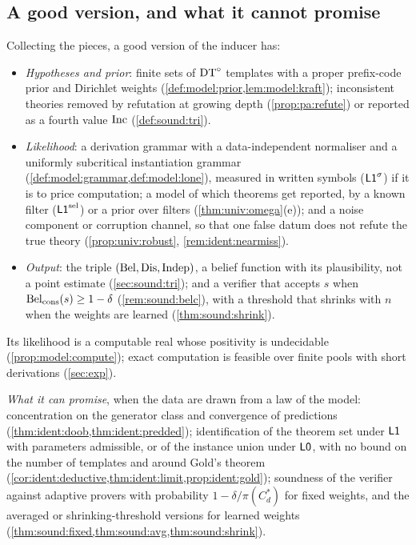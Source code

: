 \subsection{A good version, and what it cannot promise}\label{sec:disc:good}

Collecting the pieces, a good version of the inducer has:
\begin{itemize}[leftmargin=*]
\item \emph{Hypotheses and prior}: finite sets of $\mathrm{DT}^{\circ}$ templates with a proper prefix-code prior and Dirichlet weights (\cref{def:model:prior,lem:model:kraft}); inconsistent theories removed by refutation at growing depth (\cref{prop:pa:refute}) or reported as a fourth value $\mathrm{Inc}$ (\cref{def:sound:tri}).
\item \emph{Likelihood}: a derivation grammar with a data-independent normaliser and a uniformly subcritical instantiation grammar (\cref{def:model:grammar,def:model:lone}), measured in written symbols ($\mathord{\mathsf{L1}}^{\sigma}$) if it is to price computation; a model of which theorems get reported, by a known filter ($\mathord{\mathsf{L1}}^{\mathrm{sel}}$) or a prior over filters (\cref{thm:univ:omega}(e)); and a noise component or corruption channel, so that one false datum does not refute the true theory (\cref{prop:univ:robust}, \cref{rem:ident:nearmiss}).
\item \emph{Output}: the triple $(\mathrm{Bel},\mathrm{Dis},\mathrm{Indep})$, a belief function with its plausibility, not a point estimate (\cref{sec:sound:tri}); and a verifier that accepts $s$ when $\mathrm{Bel}_{\mathrm{cons}}(s)\ge1-\delta$ (\cref{rem:sound:belc}), with a threshold that shrinks with $n$ when the weights are learned (\cref{thm:sound:shrink}).
\end{itemize}
Its likelihood is a computable real whose positivity is undecidable (\cref{prop:model:compute}); exact computation is feasible over finite pools with short derivations (\cref{sec:exp}).

\emph{What it can promise}, when the data are drawn from a law of the model: concentration on the generator class and convergence of predictions (\cref{thm:ident:doob,thm:ident:predded}); identification of the theorem set under $\mathord{\mathsf{L1}}$ with parameters admissible, or of the instance union under $\mathord{\mathsf{L0}}$, with no bound on the number of templates and around Gold's theorem (\cref{cor:ident:deductive,thm:ident:limit,prop:ident:gold}); soundness of the verifier against adaptive provers with probability $1-\delta/\pi(C^*_d)$ for fixed weights, and the averaged or shrinking-threshold versions for learned weights (\cref{thm:sound:fixed,thm:sound:avg,thm:sound:shrink}).

